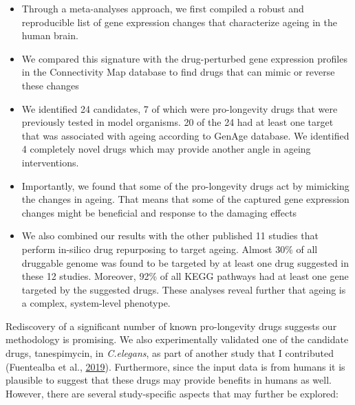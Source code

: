 \documentclass[12pt,twoside]{unicam}
\providecommand{\tightlist}{%
  \setlength{\itemsep}{0pt}\setlength{\parskip}{0pt}}
\begin{document}
\begin{itemize}
\tightlist
\item
  Through a meta-analyses approach, we first compiled a robust and reproducible list of gene expression changes that characterize ageing in the human brain.
\item
  We compared this signature with the drug-perturbed gene expression profiles in the Connectivity Map database to find drugs that can mimic or reverse these changes
\item
  We identified 24 candidates, 7 of which were pro-longevity drugs that were previously tested in model organisms. 20 of the 24 had at least one target that was associated with ageing according to GenAge database. We identified 4 completely novel drugs which may provide another angle in ageing interventions.
\item
  Importantly, we found that some of the pro-longevity drugs act by mimicking the changes in ageing. That means that some of the captured gene expression changes might be beneficial and response to the damaging effects
\item
  We also combined our results with the other published 11 studies that perform in-silico drug repurposing to target ageing. Almost 30\% of all druggable genome was found to be targeted by at least one drug suggested in these 12 studies. Moreover, 92\% of all KEGG pathways had at least one gene targeted by the suggested drugs. These analyses reveal further that ageing is a complex, system-level phenotype.
\end{itemize}

Rediscovery of a significant number of known pro-longevity drugs suggests our methodology is promising. We also experimentally validated one of the candidate drugs, tanespimycin, in \emph{C.elegans}, as part of another study that I contributed (Fuentealba et al., \protect\hyperlink{ref-Fuentealba2019}{2019}). Furthermore, since the input data is from humans it is plausible to suggest that these drugs may provide benefits in humans as well. However, there are several study-specific aspects that may further be explored:
\end{document}
